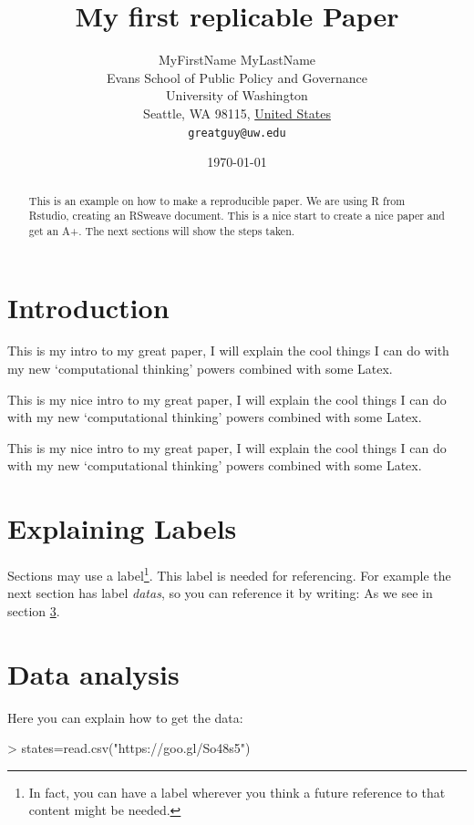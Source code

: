\documentclass[11pt]{article}
\title{My first replicable Paper}
\author{
        MyFirstName MyLastName\\
        Evans School of Public Policy and Governance\\
        University of Washington\\
        Seattle, WA 98115, \underline{United States}\\
        \texttt{greatguy@uw.edu}
}
\date{\today}
\begin{document}


\maketitle


\begin{abstract}
This is an example on how to make a reproducible paper. We are using R from Rstudio, creating an RSweave document. This is a nice start to create a nice paper and get an A+. The next sections will show the steps taken.
\end{abstract}

\section{Introduction}\label{intro}
This is my intro to my great paper, I will explain the cool things I can do with my new `computational thinking' powers combined with some Latex.

This is my nice intro to my great paper, 
I will explain the cool things I can do with my new `computational thinking' powers combined with some Latex.



This is my nice intro to my great paper, 
I will explain the cool things 
I can do with my new `computational thinking' 
powers
combined with some Latex.

\section{Explaining Labels}\label{outline}

Sections may use a label\footnote{In fact, you can have a label wherever you think a future reference to that content might be needed.}. This label is needed for referencing. For example the next section has label \emph{datas}, so you can reference it by writing: As we see in section \ref{datas}.

\section{Data analysis}\label{datas}

Here you can explain how to get the data:

\begin{Schunk}
\begin{Sinput}
> states=read.csv("https://goo.gl/So48s5")
\end{Sinput}
\end{Schunk}
\end{document}
